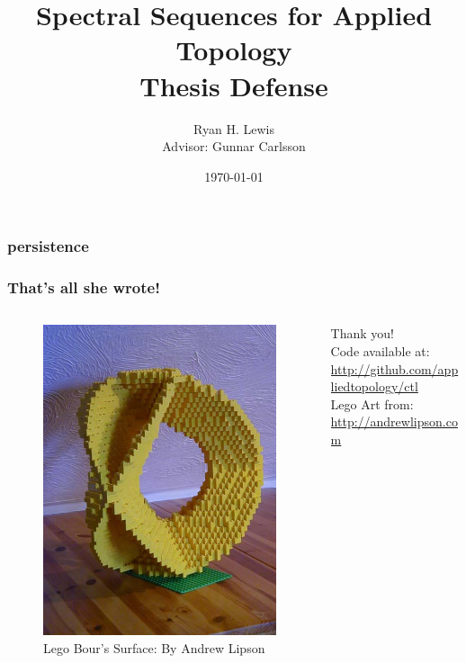 \documentclass{beamer}
\title{Spectral Sequences for Applied Topology \\ Thesis Defense}
\author{Ryan H. Lewis \vspace{.5cm} \\ Advisor:  Gunnar Carlsson}
\date{\today}
\begin{document}
\frame{\titlepage}





\begin{frame}[fragile]
\frametitle{persistence}
\end{frame}

%
\begin{frame}
\frametitle{That's all she wrote!}
\begin{columns}
	\begin{column}{.4\textwidth}
	\begin{figure}
		\includegraphics[width=\textwidth]{bours_big.jpg}
		\caption{Lego Bour's Surface: By Andrew Lipson}
	\end{figure}
\end{column}
\begin{column}{.7\textwidth}
Thank you!  \\
Code available at: \\
\url{http://github.com/appliedtopology/ctl}  \\
\vspace{1cm}
Lego Art from: \\ 
\url{http://andrewlipson.com}
\end{column}
\end{columns}
\end{frame}
\end{document}
